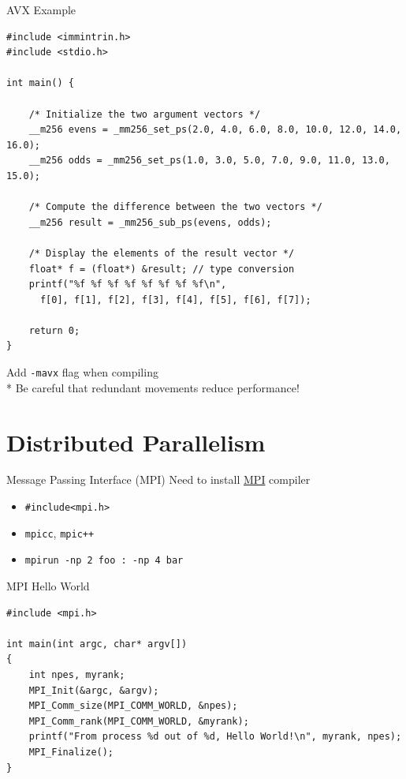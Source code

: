 \documentclass{../TexTemplate/myslide}
\begin{document}
\begin{frame}[fragile]{AVX Example}
\begin{lstlisting}[basicstyle=\scriptsize]
#include <immintrin.h>
#include <stdio.h>

int main() {

    /* Initialize the two argument vectors */
    __m256 evens = _mm256_set_ps(2.0, 4.0, 6.0, 8.0, 10.0, 12.0, 14.0, 16.0);
    __m256 odds = _mm256_set_ps(1.0, 3.0, 5.0, 7.0, 9.0, 11.0, 13.0, 15.0);

    /* Compute the difference between the two vectors */
    __m256 result = _mm256_sub_ps(evens, odds);

    /* Display the elements of the result vector */
    float* f = (float*) &result; // type conversion
    printf("%f %f %f %f %f %f %f %f\n",
      f[0], f[1], f[2], f[3], f[4], f[5], f[6], f[7]);

    return 0;
}
\end{lstlisting}
Add \verb'-mavx' flag when compiling\\
* Be careful that redundant movements reduce performance!
\end{frame}

\section{Distributed Parallelism}
\begin{frame}
\sectionpage
\end{frame}

\begin{frame}[fragile]{Message Passing Interface (MPI)}
Need to install \href{http://www.mpich.org/}{MPI} compiler
\begin{itemize}
	\item \verb'#include<mpi.h>'
	\item \verb'mpicc', \verb'mpic++'
	\item \verb'mpirun -np 2 foo : -np 4 bar'
\end{itemize}
\end{frame}

\begin{frame}[fragile]{MPI Hello World}
\begin{lstlisting}
#include <mpi.h>

int main(int argc, char* argv[])
{
    int npes, myrank;
    MPI_Init(&argc, &argv);
    MPI_Comm_size(MPI_COMM_WORLD, &npes);
    MPI_Comm_rank(MPI_COMM_WORLD, &myrank);
    printf("From process %d out of %d, Hello World!\n", myrank, npes);
    MPI_Finalize();
}
\end{lstlisting}
\end{frame}
\end{document}

